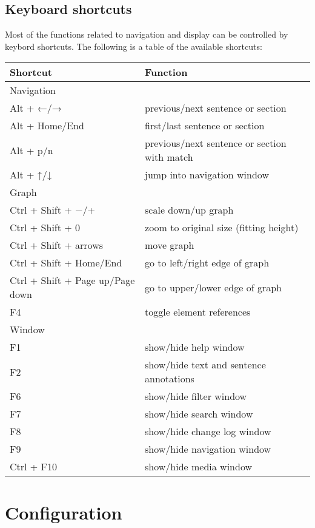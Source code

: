 \documentclass[12pt]{scrartcl}
\begin{document}
\subsection{Keyboard shortcuts}\label{shortcuts}

Most of the functions related to navigation and display can be controlled by keybord shortcuts.
The following is a table of the available shortcuts:

\begin{center}
	\begin{tabular*}{\textwidth}{ll}
		\toprule
		Shortcut & Function \\
		\midrule
		Navigation & \\
		\midrule
			Alt + ←/→ & previous/next sentence or section\\
			Alt + Home/End & first/last sentence or section \\
			Alt + p/n & previous/next sentence or section with match\\
			Alt + ↑/↓ & jump into navigation window\\
		\midrule
		Graph & \\
		\midrule
			Ctrl + Shift + −/+ & scale down/up graph\\
			Ctrl + Shift + 0 & zoom to original size (fitting height) \\
			Ctrl + Shift + arrows & move graph\\
			Ctrl + Shift + Home/End & go to left/right edge of graph\\
			Ctrl + Shift + Page up/Page down& go to upper/lower edge of graph\\
			F4 & toggle element references\\
		\midrule
		Window & \\
		\midrule
			F1 & show/hide help window \\
			F2 & show/hide text and sentence annotations\\
			F6 & show/hide filter window\\
			F7 & show/hide search window\\
			F8 & show/hide change log window\\
			F9 & show/hide navigation window\\
			Ctrl + F10 & show/hide media window\\
		\bottomrule
	\end{tabular*}
\end{center}



\section{Configuration}\label{konfiguration}
\end{document}
